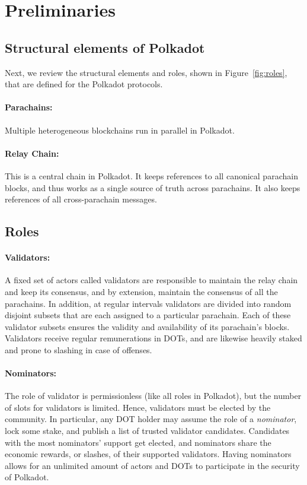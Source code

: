\section{Preliminaries}

\subsection{Structural elements of Polkadot}
Next, we review the structural elements and roles, shown in Figure~\ref{fig:roles}, that are defined for the Polkadot protocols.  
\paragraph{Parachains:} Multiple heterogeneous blockchains run in parallel in Polkadot.

\paragraph{Relay Chain:} This is a central chain in Polkadot. It keeps references
to all canonical parachain blocks, and thus works as a single source of truth across parachains.
It also keeps references of all cross-parachain messages.

\subsection{Roles}

\paragraph{Validators:} A fixed set of actors called validators are responsible to maintain the relay chain
and keep its consensus, and by extension, maintain the consensus of all the parachains.
In addition, at regular intervals validators are divided into random disjoint subsets
that are each assigned to a particular parachain.
Each of these validator subsets ensures the validity and availability of its parachain's blocks.
Validators receive regular remunerations in DOTs,
and are likewise heavily staked and prone to slashing in case of offenses.

\paragraph{Nominators:} The role of validator is permissionless (like all roles in Polkadot),
but the number of slots for validators is limited. Hence, validators must be elected by the community.
In particular, any DOT holder may assume the role of a \emph{nominator}, lock some stake, and publish a list
of trusted validator candidates. Candidates with the most nominators' support get elected,
and nominators share the economic rewards, or slashes, of their supported validators.
Having nominators allows for an unlimited amount of actors and DOTs to participate in the security of Polkadot.

